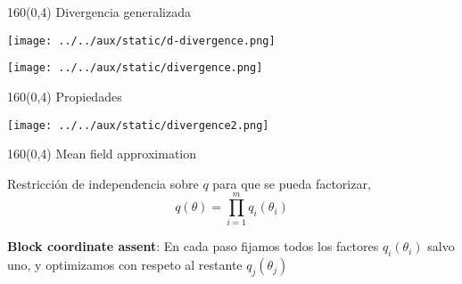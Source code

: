 \documentclass[shownotes,aspectratio=169]{beamer}
\begin{document}
\begin{frame}[plain]
 \begin{textblock}{160}(0,4)
\centering \Large Divergencia generalizada
\end{textblock}
\vspace{0.5cm}


\centering
\texttt{[image: ../../aux/static/d-divergence.png]}

\vspace{0.3cm}

\texttt{[image: ../../aux/static/divergence.png]}
 

\end{frame}


\begin{frame}[plain]
 \begin{textblock}{160}(0,4)
\centering \Large Propiedades
\end{textblock}
\vspace{0.5cm}

\centering
\texttt{[image: ../../aux/static/divergence2.png]}


\end{frame}

\begin{frame}[plain]
 \begin{textblock}{160}(0,4)
\centering \Large Mean field approximation
\end{textblock}
\vspace{0.5cm}

Restricci\'on de independencia sobre $q$ para que se pueda factorizar,
\begin{equation*}
 q(\theta) = \prod_{i=1}^m q_i(\theta_i)
\end{equation*}

\textbf{Block coordinate assent}: En cada paso fijamos todos los factores $q_i(\theta_i)$ salvo uno, y optimizamos con respeto al restante $q_j(\theta_j)$
% 

\end{frame}
\end{document}

